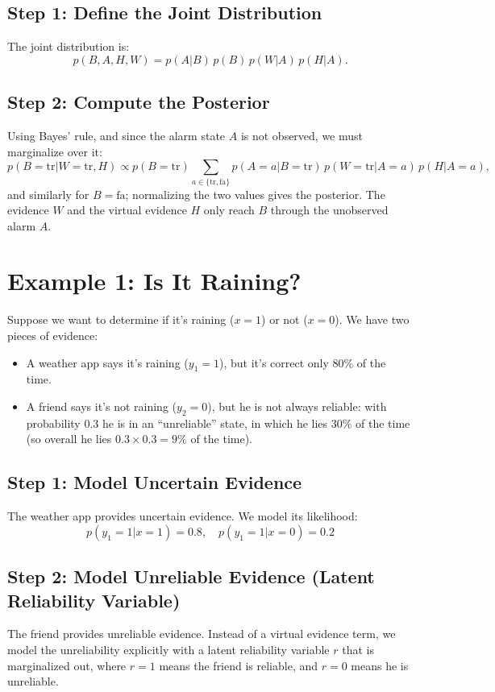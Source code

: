 \begin{notechapter}
\subsection{Step 1: Define the Joint Distribution}
The joint distribution is:
\[
p(B, A, H, W) = p(A | B) \, p(B) \, p(W | A) \, p(H | A).
\]

\subsection{Step 2: Compute the Posterior}
Using Bayes' rule, and since the alarm state \( A \) is not observed, we must marginalize over it:
\[
p(B = \text{tr} | W = \text{tr}, H) \propto p(B = \text{tr}) \sum_{a \in \{\text{tr},\text{fa}\}} p(A = a | B = \text{tr}) \, p(W = \text{tr} | A = a) \, p(H | A = a),
\]
and similarly for \( B = \text{fa} \); normalizing the two values gives the posterior. The evidence
\( W \) and the virtual evidence \( H \) only reach \( B \) through the unobserved alarm \( A \).

\section{Example 1: Is It Raining?}
Suppose we want to determine if it's raining (\( x = 1 \)) or not
(\( x = 0 \)). We have two pieces of evidence:
\begin{itemize}
    \item A weather app says it's raining (\( y_1 = 1 \)), but it's
          correct only 80\% of the time.
        \item A friend says it's not raining (\( y_2 = 0 \)), but he
          is not always reliable: with probability 0.3 he is in an
          ``unreliable'' state, in which he lies 30\% of the time (so
          overall he lies \( 0.3 \times 0.3 = 9\% \) of the time).
\end{itemize}

\subsection{Step 1: Model Uncertain Evidence}
The weather app provides uncertain evidence. We model its
likelihood:
\[
p(y_1 = 1 | x = 1) = 0.8, \quad p(y_1 = 1 | x = 0) = 0.2
\]

\subsection{Step 2: Model Unreliable Evidence (Latent Reliability Variable)}
The friend provides unreliable evidence. Instead of a virtual evidence term, we
model the unreliability explicitly with a latent reliability
variable \( r \) that is marginalized out, where \( r = 1 \) means the friend is reliable,
and \( r = 0 \) means he is unreliable.


\end{notechapter}
